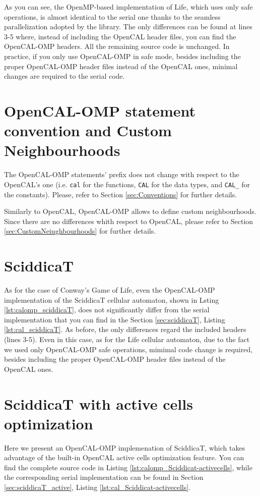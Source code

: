 As you can see, the OpenMP-based implementation of Life, which uses
only safe operations, is almost identical to the serial one thanks to
the seamless parallelization adopted by the library.  The only
differences can be found at lines 3-5 where, instead of including the
OpenCAL header files, you can find the OpenCAL-OMP headers. All the
remaining source code is unchanged. In practice, if you only use
OpenCAL-OMP in safe mode, besides including the proper OpenCAL-OMP
header files instead of the OpenCAL ones, minimal changes are required
to the serial code.

\section{OpenCAL-OMP statement convention and Custom Neighbourhoods}

The OpenCAL-OMP statements' prefix does not change with respect to the
OpenCAL's one (i.e. \verb'cal' for the functions, \verb'CAL' for the
data types, and \verb'CAL_' for the constants). Please, refer to
Section \ref{sec:Conventions} for further details.

Similarly to OpenCAL, OpenCAL-OMP allows to define custom
neighbourhoods. Since there are no differences whith respect to
OpenCAL, please refer to Section \ref{sec:CustomNeiughbourhoods} for
further details.

\section{SciddicaT}

As for the case of Conway's Game of Life, even the OpenCAL-OMP
implementation of the SciddicaT cellular automaton, shown in Lsting
\ref{lst:calomp_sciddicaT}, does not significantly differ from the
serial implementation that you can find in the Section
\ref{sec:sciddicaT}, Listing \ref{lst:cal_sciddicaT}. As before, the
only differences regard the included headers (lines 3-5). Even in this
case, as for the Life cellular automaton, due to the fact we used only
OpenCAL-OMP safe operations, mimimal code change is required, besides
including the proper OpenCAL-OMP header files instead of the OpenCAL
ones.



\section{SciddicaT with active cells optimization}
Here we present an OpenCAL-OMP implemenation of SciddicaT, which takes
advantage of the built-in OpenCAL active cells optimization feature. You can
find the complete source code in Listing
\ref{lst:calomp_Sciddicat-activecells}, while the corresponding serial
implementation can be found in Section
\ref{sec:sciddicaT_active}, Listing
\ref{lst:cal_Sciddicat-activecells}.

